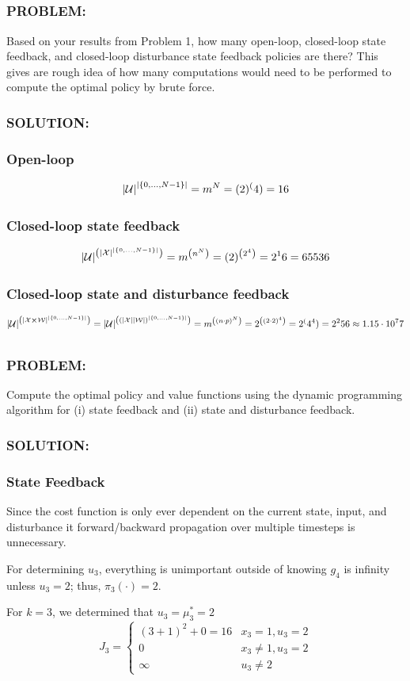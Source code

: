\documentclass[]{article}
\newcommand{\Problem}{\subsubsection*{\textbf{PROBLEM:}}}
\newcommand{\Solution}{\subsubsection*{\textbf{SOLUTION:}}}
\begin{document}
\subsection{}
\Problem
Based on your results from Problem 1, how many open-loop, closed-loop state feedback, and closed-loop disturbance state feedback policies are there? 
This gives are rough idea of how many computations would need to be performed to compute the optimal policy by brute force.
\Solution
\subsubsection{Open-loop}
\[
    \abs{\mathcal{U}}^\abs{\{0,\dots, N-1\}} = m^N = (2)^(4) = 16
\]
\subsubsection{Closed-loop state feedback}
\[
    \abs{\mathcal{U}}^\qty(\abs{\mathcal{X}}^\abs{\{0,\dots,N-1\}}) = m^\qty(n^N) = (2)^\qty(2^4) = 2^16 = 65536
\]
\subsubsection{Closed-loop state and disturbance feedback}
\[
    \abs{\mathcal{U}}^\qty(\abs{\mathcal{X} \cross \mathcal{W}}^\abs{\{0,\dots,N-1\}})
    = \abs{\mathcal{U}}^\qty(\qty(\abs{\mathcal{X}} \abs{\mathcal{W}})^\abs{\{0,\dots,N-1\}})
    = m^\qty((n\cdot p)^N)
    = 2^\qty((2 \cdot 2)^4)
    = 2^(4^4)
    = 2^256
    \approx 1.15 \cdot 10^77
\]

\subsection{}
\Problem
Compute the optimal policy and value functions using the dynamic programming algorithm for (i) state feedback and (ii) state and disturbance feedback.

\Solution
\subsubsection{State Feedback}
Since the cost function is only ever dependent on the current state, input, and disturbance it forward/backward propagation over multiple timesteps is unnecessary.

For determining $u_3$, everything is unimportant outside of knowing $g_4$ is infinity unless $u_3 = 2$; thus, $\pi_3(\cdot) = 2$.

For $k=3$, we determined that $u_3 = \mu_3^* = 2$ \[
    J_3 = \begin{cases}
        (3+1)^2 + 0=16& x_3=1, u_3 = 2\\
        0 &x_3 \neq 1, u_3 = 2\\
        \infty & u_3 \neq 2
    \end{cases}
\]
\end{document}
